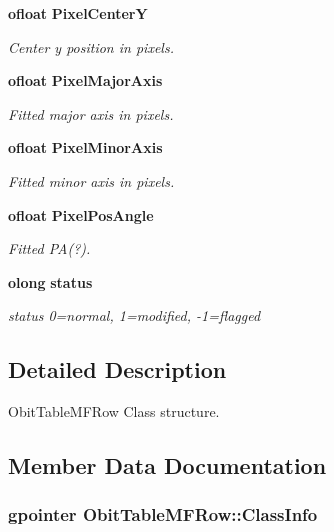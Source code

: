 \begin{CompactItemize}
{\bf ofloat} {\bf Pixel\-Center\-Y}
\begin{CompactList}\small\item\em Center y position in pixels. \item\end{CompactList}\item 
{\bf ofloat} {\bf Pixel\-Major\-Axis}
\begin{CompactList}\small\item\em Fitted major axis in pixels. \item\end{CompactList}\item 
{\bf ofloat} {\bf Pixel\-Minor\-Axis}
\begin{CompactList}\small\item\em Fitted minor axis in pixels. \item\end{CompactList}\item 
{\bf ofloat} {\bf Pixel\-Pos\-Angle}
\begin{CompactList}\small\item\em Fitted PA(?). \item\end{CompactList}\item 
{\bf olong} {\bf status}
\begin{CompactList}\small\item\em status 0=normal, 1=modified, -1=flagged \item\end{CompactList}\end{CompactItemize}


\subsection{Detailed Description}
Obit\-Table\-MFRow Class structure. 



\subsection{Member Data Documentation}
\subsubsection{\setlength{\rightskip}{0pt plus 5cm}gpointer {\bf Obit\-Table\-MFRow::Class\-Info}}\label{structObitTableMFRow_o1}


